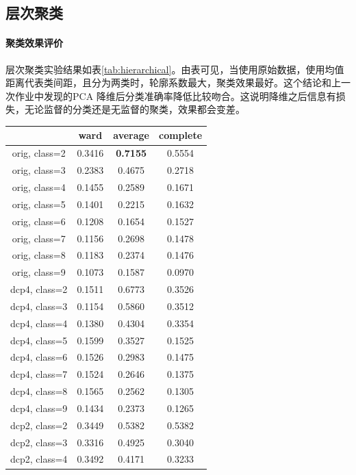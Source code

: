 \subsection{层次聚类}
\paragraph{聚类效果评价} 层次聚类实验结果如表\ref{tab:hierarchical}。由表可见，当使用原始数据，使用均值距离代表类间距，且分为两类时，轮廓系数最大，聚类效果最好。这个结论和上一次作业中发现的{\ttfamily PCA} 降维后分类准确率降低比较吻合。这说明降维之后信息有损失，无论监督的分类还是无监督的聚类，效果都会变差。

\begin{table}[htbp]
\centering
\begin{tabular}{cccc}
\toprule
{} &    ward & average & complete \\
\midrule
orig, class=2 &  0.3416 &  \textbf{0.7155} &   0.5554 \\
orig, class=3 &  0.2383 &  0.4675 &   0.2718 \\
orig, class=4 &  0.1455 &  0.2589 &   0.1671 \\
orig, class=5 &  0.1401 &  0.2215 &   0.1632 \\
orig, class=6 &  0.1208 &  0.1654 &   0.1527 \\
orig, class=7 &  0.1156 &  0.2698 &   0.1478 \\
orig, class=8 &  0.1183 &  0.2374 &   0.1476 \\
orig, class=9 &  0.1073 &  0.1587 &   0.0970 \\
dcp4, class=2 &  0.1511 &  0.6773 &   0.3526 \\
dcp4, class=3 &  0.1154 &  0.5860 &   0.3512 \\
dcp4, class=4 &  0.1380 &  0.4304 &   0.3354 \\
dcp4, class=5 &  0.1599 &  0.3527 &   0.1525 \\
dcp4, class=6 &  0.1526 &  0.2983 &   0.1475 \\
dcp4, class=7 &  0.1524 &  0.2646 &   0.1375 \\
dcp4, class=8 &  0.1565 &  0.2562 &   0.1305 \\
dcp4, class=9 &  0.1434 &  0.2373 &   0.1265 \\
dcp2, class=2 &  0.3449 &  0.5382 &   0.5382 \\
dcp2, class=3 &  0.3316 &  0.4925 &   0.3040 \\
dcp2, class=4 &  0.3492 &  0.4171 &   0.3233 \\

\end{tabular}
\end{table}
